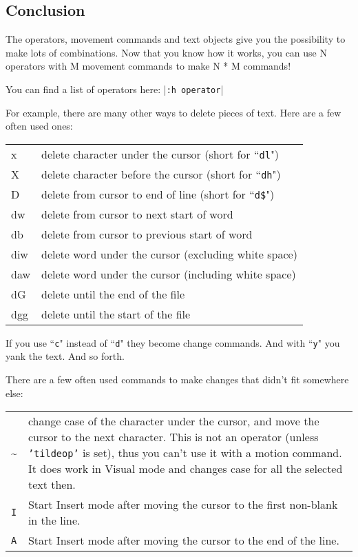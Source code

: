 \subsection{Conclusion}

The operators, movement commands and text objects give you the possibility to make lots of combinations.
Now that you know how it works, you can use N operators with M movement commands to make N * M commands!

You can find a list of operators here: |\texttt{:h operator}|

For example, there are many other ways to delete pieces of text.
Here are a few often used ones:

\begin{longtable}{l l}
				x & delete character under the cursor (short for ``\texttt{dl}") \\
				X & delete character before the cursor (short for ``\texttt{dh}") \\
				D & delete from cursor to end of line (short for ``\texttt{d\$}") \\
				dw & delete from cursor to next start of word \\
				db & delete from cursor to previous start of word \\
				diw & delete word under the cursor (excluding white space) \\
				daw & delete word under the cursor (including white space) \\
				dG & delete until the end of the file \\
				dgg & delete until the start of the file \\
\end{longtable}

If you use ``\texttt{c}" instead of ``\texttt{d}" they become change commands.
And with ``\texttt{y}" you yank the text.
And so forth.

There are a few often used commands to make changes that didn't fit somewhere else:

\begin{tabularx}{\textwidth}{l X}
				\textasciitilde &
				change case of the character under the cursor, and move the cursor to the next character.
				This is not an operator (unless \texttt{'tildeop'} is set), thus you can't use it with a motion command.
				It does work in Visual mode and changes case for all the selected text then. \\

				\texttt{I} &
				Start Insert mode after moving the cursor to the first non-blank in the line.\\

				\texttt{A} &
				Start Insert mode after moving the cursor to the end of the line.
\end{tabularx}
\clearpage
